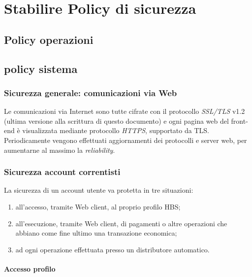 \section{Stabilire Policy di sicurezza}


\subsection{Policy operazioni}



\subsection{policy sistema}
	\subsubsection{Sicurezza generale: comunicazioni via Web}
Le comunicazioni via Internet sono tutte cifrate con il protocollo \emph{SSL/TLS} v1.2 (ultima versione alla scrittura di questo documento) e ogni pagina web del front-end è visualizzata mediante protocollo \emph{HTTPS}, supportato da TLS.
\linebreak
Periodicamente vengono effettuati aggiornamenti dei protocolli e server web, per aumentarne al massimo la \emph{reliability}.




	\subsubsection{Sicurezza account correntisti}
La sicurezza di un account utente va protetta in tre situazioni:
\begin{enumerate}
\item all'accesso, tramite Web client, al proprio profilo HBS;
\item all'esecuzione, tramite Web client, di pagamenti o altre operazioni che abbiano come fine ultimo una transazione economica;
\item ad ogni operazione effettuata presso un distributore automatico.
\end{enumerate}

\paragraph{Accesso profilo}

